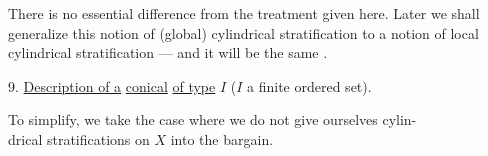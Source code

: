 There is no essential difference from
the treatment given here. Later we
shall generalize this notion of (global) cylindrical
stratification to a notion of
local cylindrical stratification --- and it will be
the same .

9. \uline{Description of a} \uline{conical} 
 \uline{of type} \(I\)
(\(I\) a finite ordered set).

To simplify, we  take the case where we
do not give ourselves cylin-\\
drical stratifications on \(X\) into the bargain.


